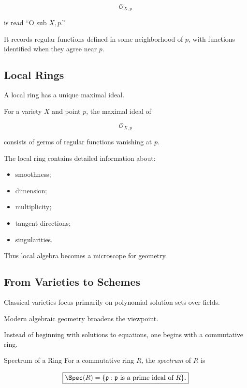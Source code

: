 \[
\mathcal{O}_{X,p}
\]

is read ``O sub \(X,p\).''

It records regular functions defined in some neighborhood of \(p\), with
functions identified when they agree near \(p\).

\subsection{Local Rings}
\label{subsec:geometry-local-rings}

A local ring has a unique maximal ideal.

For a variety \(X\) and point \(p\), the maximal ideal of

\[
\mathcal{O}_{X,p}
\]

consists of germs of regular functions vanishing at \(p\).

The local ring contains detailed information about:

\begin{itemize}
    \item smoothness;
    \item dimension;
    \item multiplicity;
    \item tangent directions;
    \item singularities.
\end{itemize}

Thus local algebra becomes a microscope for geometry.

\subsection{From Varieties to Schemes}
\label{subsec:varieties-to-schemes}

Classical varieties focus primarily on polynomial solution sets over fields.

Modern algebraic geometry broadens the viewpoint.

Instead of beginning with solutions to equations, one begins with a
commutative ring.

\begin{definitionbox}{Spectrum of a Ring}
For a commutative ring \(R\), the \emph{spectrum} of \(R\) is

\[
\boxed{
\Spec(R)
=
\{
\mathfrak p:
\mathfrak p
\text{ is a prime ideal of }R
\}.
}
\]
\end{definitionbox}

